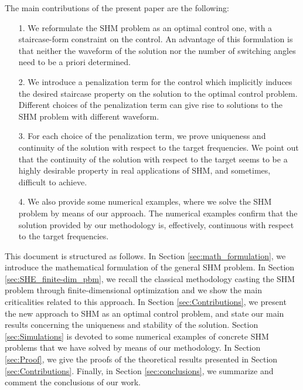 \documentclass[twocolumn]{autart}    %
\begin{document}
The main contributions of the present paper are the following:
\begin{enumerate}
    \item[1.] We reformulate the SHM problem as an optimal control one, with a staircase-form constraint on the control. An advantage of this formulation is that neither the waveform of the solution nor the number of switching angles need to be a priori determined.  
    \item[2.] We introduce a penalization term for the control which implicitly induces the desired staircase property on the solution to the optimal control problem.  Different choices of the penalization term can give rise to  solutions to the SHM problem with different waveform.
	\item[3. ] For each choice of the penalization term, we prove  uniqueness and continuity of the solution with respect to the target frequencies.  We point out that the continuity of the solution with respect to the target seems to be a highly desirable property in real applications of SHM, and sometimes, difficult to achieve.
	\item[4.] We also provide some numerical examples, where we solve the SHM problem by means of our approach. The numerical examples confirm that the solution provided by our methodology is, effectively, continuous with respect to the target frequencies.
\end{enumerate}

This document is structured as follows. In Section \ref{sec:math_formulation}, we introduce the mathematical formulation of the general SHM problem. 
In Section \ref{sec:SHE_finite-dim_pbm}, we recall the classical methodology casting the SHM problem through finite-dimensional optimization and we show the main criticalities related to this approach. In Section \ref{sec:Contributions}, we present the new approach to SHM  as an optimal control problem, and state our main results concerning the uniqueness and stability of the solution. Section \ref{sec:Simulations} is devoted to some numerical examples of concrete SHM problems that we have solved by means of our methodology. In Section \ref{sec:Proof}, we give the proofs of the theoretical results presented in Section \ref{sec:Contributions}. Finally, in Section \ref{sec:conclusions}, we summarize and comment the conclusions of our work.
\end{document}
